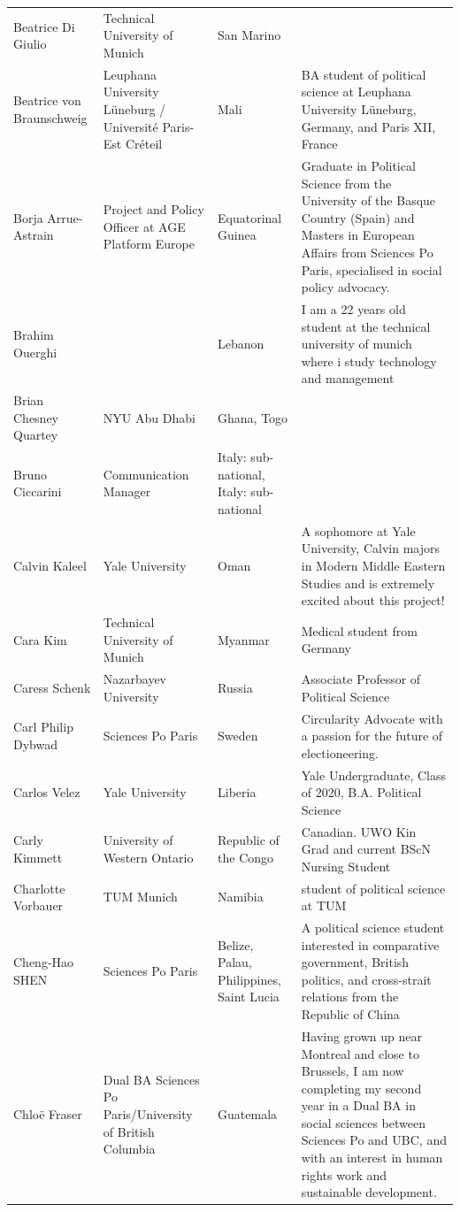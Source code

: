 \documentclass[]{article}
\begin{document}
\begin{longtable}{l>{\raggedright\arraybackslash}p{2cm}>{\raggedright\arraybackslash}p{2cm}>{\raggedright\arraybackslash}p{3cm}}
\rowcolor{gray!6}  Beatrice Di Giulio & Technical University of Munich & San Marino & \\
Beatrice von Braunschweig & Leuphana University Lüneburg / Université Paris-Est Créteil & Mali & BA student of political science at Leuphana University Lüneburg, Germany, and Paris XII, France\\
\rowcolor{gray!6}  Borja Arrue-Astrain & Project and Policy Officer at AGE Platform Europe & Equatorinal Guinea & Graduate in Political Science from the University of the Basque Country (Spain) and Masters in European Affairs from Sciences Po Paris, specialised in social policy advocacy.\\
\addlinespace
Brahim Ouerghi &  & Lebanon & I am a 22 years old student at the technical university of munich where i study technology and management\\
\rowcolor{gray!6}  Brian Chesney Quartey & NYU Abu Dhabi & Ghana, Togo & \\
Bruno Ciccarini & Communication Manager & Italy: sub-national, Italy: sub-national & \\
\rowcolor{gray!6}  Calvin Kaleel & Yale University & Oman & A sophomore at Yale University, Calvin majors in Modern Middle Eastern Studies and is extremely excited about this project!\\
Cara Kim & Technical University of Munich & Myanmar & Medical student from Germany\\
\addlinespace
\rowcolor{gray!6}  Caress Schenk & Nazarbayev University & Russia & Associate Professor of Political Science\\
Carl Philip Dybwad & Sciences Po Paris & Sweden & Circularity Advocate with a passion for the future of electioneering.\\
\rowcolor{gray!6}  Carlos Velez & Yale University & Liberia & Yale Undergraduate, Class of 2020, B.A. Political Science\\
Carly Kimmett & University of Western Ontario & Republic of the Congo & Canadian. UWO Kin Grad and current BScN Nursing Student\\
\rowcolor{gray!6}  Charlotte Vorbauer & TUM Munich & Namibia & student of political science at TUM\\
\addlinespace
Cheng-Hao SHEN & Sciences Po Paris & Belize, Palau, Philippines, Saint Lucia & A political science student interested in comparative government, British politics, and cross-strait relations from the Republic of China\\
\rowcolor{gray!6}  Chloë Fraser & Dual BA Sciences Po Paris/University of British Columbia & Guatemala & Having grown up near Montreal and close to Brussels, I am now completing my second year in a Dual BA in social sciences between Sciences Po and UBC, and with an interest in human rights work and sustainable development.\\

\end{longtable}
\end{document}
